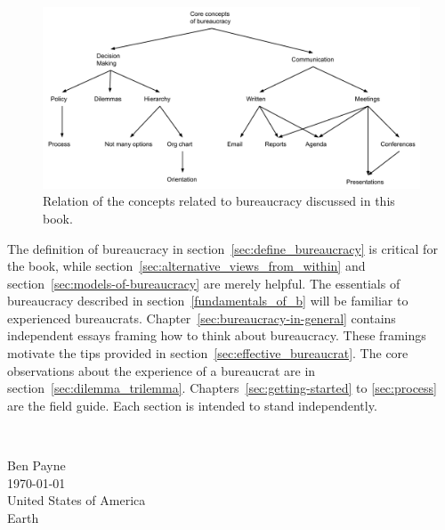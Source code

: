 \begin{figure}[ht]
    \centering
    \includegraphics[width=1\textwidth]{images/core_concepts_map.pdf}
    \caption{Relation of the concepts related to bureaucracy discussed in this book. }
    \label{fig:core-concepts}
\end{figure}



The definition of bureaucracy in section~\ref{sec:define_bureaucracy} is critical for the book, while section~\ref{sec:alternative_views_from_within} and section~\ref{sec:models-of-bureaucracy} are merely helpful. The essentials of bureaucracy described in section~\ref{fundamentals_of_b} will be familiar to experienced bureaucrats. 
Chapter~\ref{sec:bureaucracy-in-general} contains independent essays framing how to think about bureaucracy. 
These framings motivate the tips provided in section~\ref{sec:effective_bureaucrat}.
The core observations about the experience of a bureaucrat are in section~\ref{sec:dilemma_trilemma}. 
Chapters~\ref{sec:getting-started} to \ref{sec:process} are the field guide. Each section is intended to stand independently. %

\ \\

\begin{flushright}
Ben Payne\\
\today\\
United States of America\\
Earth
\end{flushright}


